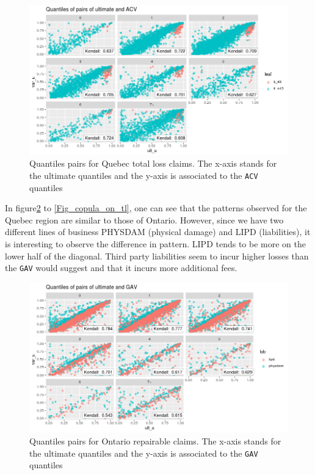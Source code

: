 	\begin{figure}[H]
		\begin{center}
			\includegraphics[scale=0.4]{Graphiques/qc_tl} 
			\renewcommand{\figurename}{Figure}
			\caption[Quebec total loss claims relationship]{Quantiles pairs for Quebec total loss claims. The x-axis stands for the ultimate quantiles and the y-axis is associated to the \texttt{ACV} quantiles}\label{Fig_copula_qc_tl}
		\end{center}
	\end{figure}

	In figure\ref{Fig_copula_on_rep} to \ref{Fig_copula_on_tl}, one can see that the patterns observed for the Quebec region are similar to those of Ontario. However, since we have two different lines of business PHYSDAM (physical damage) and LIPD (liabilities), it is interesting to observe the difference in pattern. LIPD tends to be more on the lower half of the diagonal. Third party liabilities seem to incur higher losses than the \texttt{GAV} would suggest and that it incurs more additional fees. 
	
		\begin{figure}[H]
		\begin{center}
			\includegraphics[scale=0.4]{Graphiques/on_rep} 
			\renewcommand{\figurename}{Figure}
			\caption[Ontario repairable claims relationship]{Quantiles pairs for Ontario repairable claims. The x-axis stands for the ultimate quantiles and the y-axis is associated to the \texttt{GAV} quantiles}\label{Fig_copula_on_rep}
		\end{center}
	\end{figure}
	
